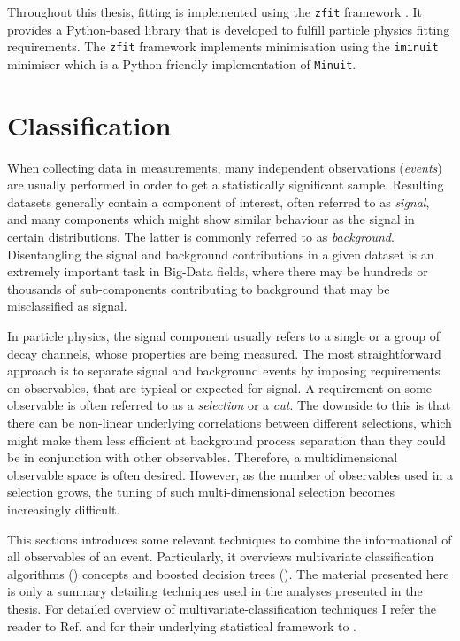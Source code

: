 Throughout this thesis, fitting is implemented using the \texttt{zfit} framework \cite{ESCHLE2020100508}. 
It provides a Python-based library that is developed to fulfill particle physics fitting requirements.
The \texttt{zfit} framework implements minimisation using the \texttt{iminuit} minimiser \cite{iminuit} which is a Python-friendly implementation of \texttt{Minuit}.

\section{Classification}
When collecting data in measurements, many independent observations (\textit{events}) are usually performed in order to get a statistically significant sample.
Resulting datasets generally contain a component of interest, often referred to as \textit{signal}, and many components which might show similar behaviour as the signal in certain distributions. 
The latter is commonly referred to as \textit{background}. Disentangling the signal and background contributions in a given dataset is an extremely important task in Big-Data fields, where there may be hundreds or thousands of sub-components contributing to background that may be misclassified as signal.

In particle physics, the signal component usually refers to a single or a group of decay channels, whose properties are being measured. 
The most straightforward approach is to separate signal and background events by imposing requirements on observables, that are typical or expected for signal.
A requirement on some observable is often referred to as a \textit{selection} or a \textit{cut}.
The downside to this is that there can be non-linear underlying correlations between different selections, which might make them less efficient at background process separation than they could be in conjunction with other observables. 
Therefore, a multidimensional observable space is often desired.
However, as the number of observables used in a selection grows, the tuning of such multi-dimensional selection becomes increasingly difficult.


This sections introduces some relevant techniques to combine the informational of all observables of an event. 
Particularly, it overviews multivariate classification algorithms () concepts and boosted decision trees (). 
The material presented here is only a summary detailing techniques used in the analyses presented in the thesis.
For detailed overview of multivariate-classification techniques I refer the reader to Ref.\cite{Behnke:2013pga} and for their underlying statistical framework to \cite{Hastie_Tibshirani_Friedman_2001,bishop_2016}.

